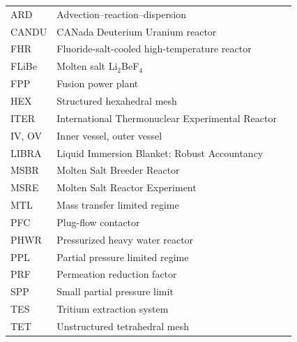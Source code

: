 \begin{xltabular}{\linewidth}{@{}l X l@{}}
\addlinespace[1em]
 \\
\midrule
ARD    & Advection--reaction--dispersion                    & \\
CANDU  & CANada Deuterium Uranium reactor                   & \\
FHR    & Fluoride-salt-cooled high-temperature reactor      & \\
FLiBe  & Molten salt Li$_2$BeF$_4$                          & \\
FPP    & Fusion power plant                                 & \\
HEX    & Structured hexahedral mesh                         & \\
ITER   & International Thermonuclear Experimental Reactor   & \\
IV, OV & Inner vessel, outer vessel                         & \\
LIBRA  & Liquid Immersion Blanket: Robust Accountancy       & \\
MSBR   & Molten Salt Breeder Reactor                        & \\
MSRE   & Molten Salt Reactor Experiment                     & \\
MTL    & Mass transfer limited regime                       & \\
PFC    & Plug-flow contactor                                & \\
PHWR   & Pressurized heavy water reactor                    & \\
PPL    & Partial pressure limited regime                    & \\
PRF    & Permeation reduction factor                        & \\
SPP    & Small partial pressure limit                            & \\
TES    & Tritium extraction system                          & \\
TET    & Unstructured tetrahedral mesh                      & \\

\end{xltabular}
